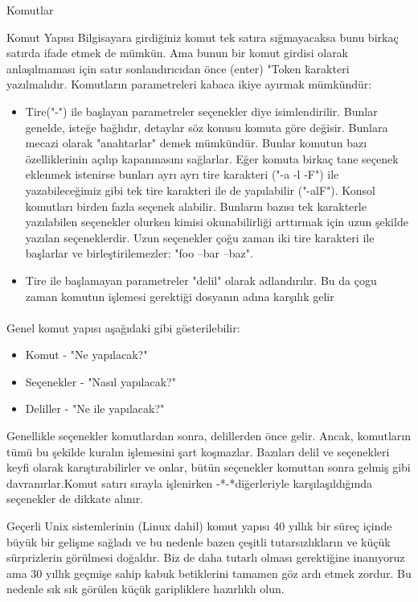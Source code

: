 \documentclass[10pt,a5paper]{book}
\begin{document}
\begin{section}{Komutlar}
\begin{subsection}{Komut Yapısı}
Bilgisayara girdiğiniz komut tek satıra sığmayacaksa bunu birkaç satırda ifade etmek de mümkün. Ama bunun bir komut girdisi olarak  anlaşılmaması için satır sonlandırıcıdan önce (enter) "Token \" karakteri yazılmalıdır. Komutların parametreleri kabaca ikiye ayırmak mümkündür:
\begin{itemize}
 \item Tire("-") ile başlayan parametreler seçenekler diye isimlendirilir. Bunlar genelde, isteğe bağlıdır, detaylar söz konusu komuta göre değisir. Bunlara mecazi olarak "anahtarlar" demek mümkündür. Bunlar komutun bazı özelliklerinin açılıp kapanmasını sağlarlar. Eğer komuta birkaç tane seçenek eklenmek istenirse bunları ayrı ayrı tire karakteri ("-a -l -F") ile yazabileceğimiz gibi tek tire karakteri ile de yapılabilir ("-alF"). Konsol komutları birden fazla seçenek alabilir. Bunların bazısı tek karakterle yazılabilen seçenekler olurken kimisi okunabilirliği arttırmak için uzun şekilde yazılan seçeneklerdir. Uzun seçenekler çoğu zaman iki tire karakteri ile başlarlar ve birleştirilemezler: "foo --bar --baz".
 \item Tire ile başlamayan parametreler "delil" olarak adlandırılır. Bu da çogu zaman komutun işlemesi gerektiği dosyanın adına karşılık gelir
\end{itemize}

\paragraph{}{Genel komut yapısı aşağıdaki gibi gösterilebilir:
\begin{itemize}
\item Komut - "Ne yapılacak?"
\item Seçenekler - "Nasıl yapılacak?"
\item Deliller - "Ne ile yapılacak?"
\end{itemize}
}
\end{subsection}

Genellikle seçenekler komutlardan sonra, delillerden önce gelir. Ancak, komutların tümü bu şekilde kuralın işlemesini şart koşmazlar. Bazıları delil ve seçenekleri keyfi olarak karıştırabilirler ve onlar, bütün seçenekler komuttan sonra gelmiş gibi davranırlar.Komut satırı sırayla işlenirken -*-*diğerleriyle karşılaşıldığında seçenekler de dikkate alınır.

Geçerli Unix sistemlerinin (Linux dahil) komut yapısı 40 yıllık bir süreç içinde büyük bir gelişme sağladı ve bu nedenle bazen çeşitli tutarsızlıkların ve küçük sürprizlerin görülmesi doğaldır. Biz de daha tutarlı olması gerektiğine inanıyoruz ama 30 yıllık geçmişe sahip kabuk betiklerini tamamen göz ardı etmek zordur. Bu nedenle sık sık görülen küçük garipliklere hazırlıklı olun.


\end{section}
\end{document}
